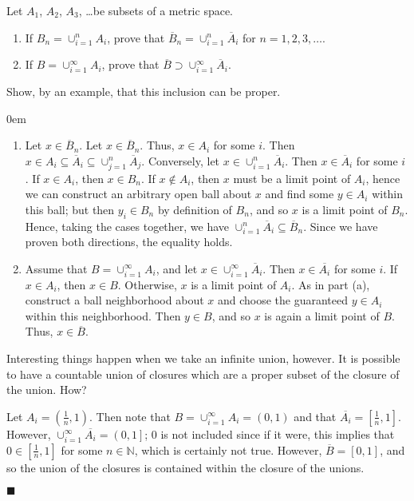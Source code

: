 \documentclass[12pt]{article}
\renewcommand{\qed}{\hfill$\blacksquare$}
\renewenvironment{proof}{\begin{addmargin}[1em]{0em}\begin{newproof}}{\end{newproof}\end{addmargin}\qed}
\newenvironment{problem}[2][Exercise]{\begin{trivlist}
\item[\hskip \labelsep {\bfseries #1}\hskip \labelsep {\bfseries #2.}]}{\end{trivlist}}
\begin{document}
\begin{problem}{2.7}
Let $A_1$, $A_2$, $A_3$, \ldots be subsets of a metric space.
\begin{enumerate}[label=(\alph*)]
	\item If $B_n = \cup_{i=1}^n A_i$, prove that $\overline{B}_n = \cup_{i=1}^n \overline{A}_i$ for $n=1,2,3,\ldots$.
	\item If $B = \cup_{i=1}^{\infty} A_i$, prove that $\overline{B} \supset \cup_{i=1}^{\infty} \overline{A}_i$.
\end{enumerate}
Show, by an example, that this inclusion can be proper.
\end{problem}

\begin{proof}
\begin{enumerate}[label=(\alph*)]
	\item Let $x \in \overline{B}_n$. Let $x\in \overline{B}_n$. Thus, $x\in A_i$ for some $i$. Then $x \in A_i \subseteq \overline{A}_i \subseteq \cup_{j=1}^n \overline{A}_j $. Conversely, let $x \in \cup_{i=1}^n \overline{A}_i$. Then $x\in \overline{A}_i$ for some $i$. If $x \in A_i$, then $x\in B_n$. If $x \notin A_i$, then $x$ must be a limit point of $A_i$, hence we can construct an arbitrary open ball about $x$ and find some $y\in A_i$ within this ball; but then $y_i \in B_n$ by definition of $B_n$, and so $x$ is a limit point of $B_n$. Hence, taking the cases together, we have $\cup_{i=1}^n \overline{A}_i \subseteq \overline{B}_n$. Since we have proven both directions, the equality holds.
	\item Assume that $B = \cup_{i=1}^{\infty} A_i$, and let $x \in \cup_{i=1}^{\infty} \overline{A}_i$. Then $x \in \overline{A_i}$ for some $i$. If $x \in A_i$, then $x \in B$. Otherwise, $x$ is a limit point of $A_i$. As in part (a), construct a ball neighborhood about $x$ and choose the guaranteed $y\in A_i$ within this neighborhood. Then $y \in B$, and so $x$ is again a limit point of $B$. Thus, $x \in \overline{B}$.
\end{enumerate}


Interesting things happen when we take an infinite union, however. It is possible to have a countable union of closures which are a proper subset of the closure of the union. How? 

Let $A_i = \left(\frac{1}{n},1\right)$. Then note that $B=\cup_{i=1}^{\infty} A_i = \left(0,1\right)$ and that $\overline{A_i} = \left[\frac{1}{n},1\right]$. However, $\cup_{i=1}^{\infty} \overline{A_i} = \left(0,1\right]$; $0$ is not included since if it were, this implies that $0\in \left[\frac{1}{n},1\right]$ for some $n\in \mathbb{N}$, which is certainly not true. However, $\overline{B} = \left[0,1\right]$, and so the union of the closures is contained within the closure of the unions.
\end{proof}
\end{document}
